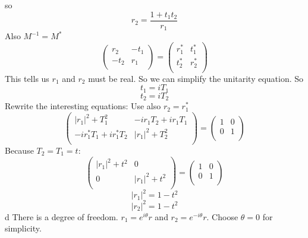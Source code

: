 so 
\begin{equation}
r_2=\frac{1+t_1t_2}{r_1}
\end{equation}
Also $M^{-1}=M^*$
\begin{equation}
\begin{pmatrix}
r_2 & -t_1 \\
-t_2 & r_1 \\
\end{pmatrix}=
\begin{pmatrix}
r^*_1 & t^*_1 \\
t^*_2 & r^*_2 \\
\end{pmatrix}
\end{equation}
This tells us $r_1$ and $r_2$ must be real.
So we can simplify the unitarity equation. 
So
\begin{equation}
t_1=iT_1
\end{equation}
\begin{equation}
t_2=iT_2
\end{equation}
Rewrite the interesting equations:
Use also $r_2=r^*_1$
\begin{equation}
\begin{pmatrix}
|r_1|^2+T_1^2 & -ir_1T_2+ir_1T_1 \\
-ir^*_1T_1+ir^*_1T_2 & |r_1|^2+T_2^2 \\
\end{pmatrix}=
\begin{pmatrix}
1 & 0 \\
0 & 1 \\
\end{pmatrix}
\end{equation}
Because $T_2=T_1=t$:
\begin{equation}
\begin{pmatrix}
|r_1|^2+t^2 & 0 \\
0 & |r_1|^2+t^2 \\
\end{pmatrix}=
\begin{pmatrix}
1 & 0 \\
0 & 1 \\
\end{pmatrix}
\end{equation}
\begin{equation}
|r_1|^2=1-t^2
\end{equation}
\begin{equation}
|r_2|^2=1-t^2
\end{equation}d
There is a degree of freedom. $r_1=e^{i\theta}r$ and $r_2=e^{-i\theta}r$. Choose $\theta = 0$ for simplicity.


